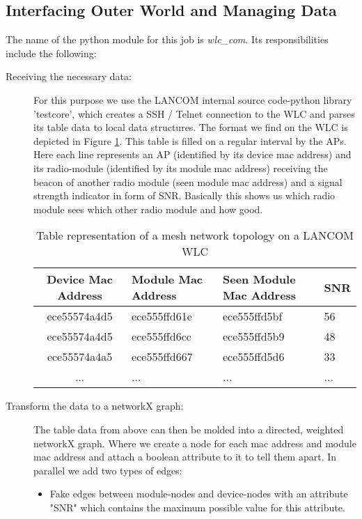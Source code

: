     \subsection{Interfacing Outer World and Managing Data}
      The name of the python module for this job is \textit{wlc\_com}. Its responsibilities include the following:
      \begin{description}
	\item[Receiving the necessary data:]
	  For this purpose we use the LANCOM internal source code-python library 'testcore', which creates a \ac{SSH} / Telnet connection to the 
	  \ac{WLC} and parses its table data to local data structures.
	  The format we find on the \ac{WLC} is depicted in Figure \ref{tab:wlc}. This table is filled on a regular interval by the APs.
	  Here each line represents an \ac{AP} (identified by its device mac address) and its radio-module (identified by its module mac address) receiving the beacon
	  of another radio module (seen module mac address) and a signal strength indicator in form of \ac{SNR}.
	  Basically this shows us which radio module sees which other radio module and how good.
	  \begin{table}[h!]
	    \begin{tabular}{clll}
	      Device Mac Address & Module Mac Address & Seen Module Mac Address & \ac{SNR}\\ \hline
	      ece55574a4d5 & ece555ffd61e & ece555ffd5bf & 56 \\
	      ece55574a4d5 & ece555ffd6cc & ece555ffd5b9 & 48 \\
	      ece55574a4a5 & ece555ffd667 & ece555ffd5d6 & 33 \\
	      ... & ... & ... & ...
	    \end{tabular}
	    \caption{Table representation of a mesh network topology on a LANCOM \ac{WLC}}
	    \label{tab:wlc}
	  \end{table}
	  
\newpage
	
	\item [Transform the data to a networkX graph:]
	  The table data from above can then be molded into a directed, weighted networkX graph. 
	  Where we create a node for each mac address and module mac address and attach a boolean attribute to it to tell them apart. 
	  In parallel we add two types of edges:

	  \begin{itemize}
	    \item Fake edges between module-nodes and device-nodes with an attribute "SNR" which contains the maximum possible value for this attribute.
	    

\end{itemize}
\end{description}
